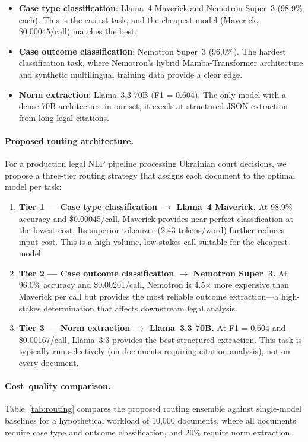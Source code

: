 \documentclass[11pt,a4paper]{article}
\begin{document}
\begin{itemize}[leftmargin=*]
    \item \textbf{Case type classification}: Llama~4 Maverick and Nemotron Super~3 (98.9\% each). This is the easiest task, and the cheapest model (Maverick, \$0.00045/call) matches the best.
    \item \textbf{Case outcome classification}: Nemotron Super~3 (96.0\%). The hardest classification task, where Nemotron's hybrid Mamba-Transformer architecture and synthetic multilingual training data provide a clear edge.
    \item \textbf{Norm extraction}: Llama~3.3 70B (F1 = 0.604). The only model with a dense 70B architecture in our set, it excels at structured JSON extraction from long legal citations.
\end{itemize}

\paragraph{Proposed routing architecture.}
For a production legal NLP pipeline processing Ukrainian court decisions, we propose a three-tier routing strategy that assigns each document to the optimal model per task:

\begin{enumerate}[leftmargin=*]
    \item \textbf{Tier 1 --- Case type classification $\rightarrow$ Llama~4 Maverick.} At 98.9\% accuracy and \$0.00045/call, Maverick provides near-perfect classification at the lowest cost. Its superior tokenizer (2.43 tokens/word) further reduces input cost. This is a high-volume, low-stakes call suitable for the cheapest model.
    \item \textbf{Tier 2 --- Case outcome classification $\rightarrow$ Nemotron Super~3.} At 96.0\% accuracy and \$0.00201/call, Nemotron is 4.5$\times$ more expensive than Maverick per call but provides the most reliable outcome extraction---a high-stakes determination that affects downstream legal analysis.
    \item \textbf{Tier 3 --- Norm extraction $\rightarrow$ Llama~3.3 70B.} At F1 = 0.604 and \$0.00167/call, Llama~3.3 provides the best structured extraction. This task is typically run selectively (on documents requiring citation analysis), not on every document.
\end{enumerate}

\paragraph{Cost--quality comparison.}
Table~\ref{tab:routing} compares the proposed routing ensemble against single-model baselines for a hypothetical workload of 10,000 documents, where all documents require case type and outcome classification, and 20\% require norm extraction.
\end{document}
